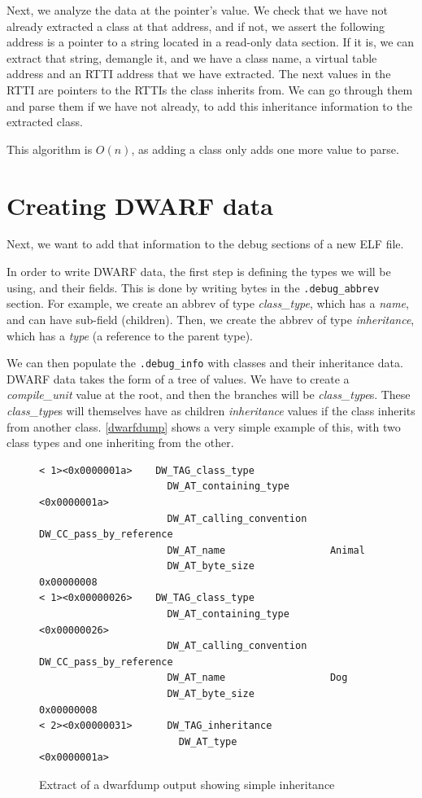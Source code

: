 \documentclass[a4paper,11pt,oneside]{report}
\begin{document}
Next, we analyze the data at the pointer's value.
We check that we have not already extracted a class at that address, and if
not, we assert the following address is a pointer to a string located in a
read-only data section.
If it is, we can extract that string, demangle it, and we have a class name,
a virtual table address and an RTTI address that we have extracted.
The next values in the RTTI are pointers to the RTTIs the class inherits from.
We can go through them and parse them if we have not already, to add this 
inheritance information to the extracted class.

This algorithm is $O(n)$, as adding a class only adds one more value to parse.


\section{Creating DWARF data}
\label{dwarfimplementation}

Next, we want to add that information to the debug sections of a new ELF file.

In order to write DWARF data, the first step is defining the types we will be 
using, and their fields.
This is done by writing bytes in the \texttt{.debug\_abbrev} section.
For example, we create an abbrev of type \emph{class\_type}, which has a 
\emph{name}, and can have sub-field (children).
Then, we create the abbrev of type \emph{inheritance}, which has a 
\emph{type} (a reference to the parent type).

We can then populate the \texttt{.debug\_info} with classes and their 
inheritance data.
DWARF data takes the form of a tree of values. We have to create a 
\emph{compile\_unit} value at the root, and then the branches will be 
\emph{class\_type}s.
These \emph{class\_type}s will themselves have as children 
\emph{inheritance} values if the class inherits from another class.
\autoref{dwarfdump} shows a very simple example of this, with two class types 
and one inheriting from the other.

\begin{figure}
\begin{lstlisting}
< 1><0x0000001a>    DW_TAG_class_type
                      DW_AT_containing_type       <0x0000001a>
                      DW_AT_calling_convention    DW_CC_pass_by_reference
                      DW_AT_name                  Animal
                      DW_AT_byte_size             0x00000008
< 1><0x00000026>    DW_TAG_class_type
                      DW_AT_containing_type       <0x00000026>
                      DW_AT_calling_convention    DW_CC_pass_by_reference
                      DW_AT_name                  Dog
                      DW_AT_byte_size             0x00000008
< 2><0x00000031>      DW_TAG_inheritance
                        DW_AT_type                  <0x0000001a>
\end{lstlisting}
\caption{Extract of a dwarfdump output showing simple inheritance}
\label{dwarfdump}
\end{figure}
\end{document}

